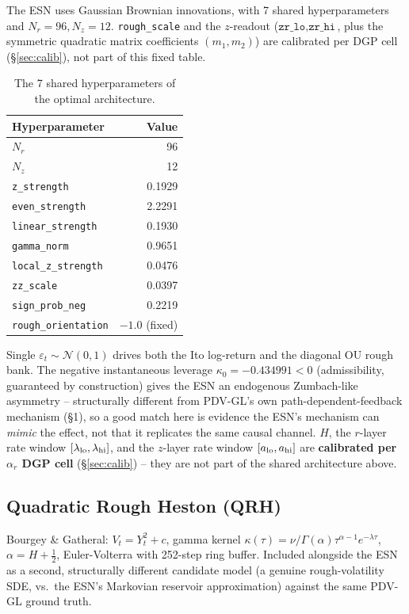 \documentclass[11pt,a4paper]{article}
\begin{document}
The ESN uses Gaussian Brownian innovations, with 7 shared
hyperparameters and $N_r=96,N_z=12$. \texttt{rough\_scale} and the
$z$-readout ($\texttt{zr\_lo},\texttt{zr\_hi}$, plus the symmetric
quadratic matrix coefficients $(m_1,m_2)$) are calibrated per DGP cell
(\S\ref{sec:calib}), not part of this fixed table.
\begin{table}[H]
\centering
\caption{The 7 shared hyperparameters of the optimal architecture.}
\label{tab:optarch}
\begin{tabular}{@{}lr@{}}
\toprule
Hyperparameter & Value \\
\midrule
$N_r$ & 96 \\
$N_z$ & 12 \\
\texttt{z\_strength} & 0.1929 \\
\texttt{even\_strength} & 2.2291 \\
\texttt{linear\_strength} & 0.1930 \\
\texttt{gamma\_norm} & 0.9651 \\
\texttt{local\_z\_strength} & 0.0476 \\
\texttt{zz\_scale} & 0.0397 \\
\texttt{sign\_prob\_neg} & 0.2219 \\
\texttt{rough\_orientation} & $-1.0$ (fixed) \\

\end{tabular}
\end{table}
Single $\varepsilon_t\sim\mathcal{N}(0,1)$ drives both the Ito log-return
and the diagonal OU rough bank. The negative instantaneous leverage
$\kappa_0=-0.434991<0$ (admissibility, guaranteed by construction) gives
the ESN an endogenous Zumbach-like asymmetry -- structurally different
from PDV-GL's own path-dependent-feedback mechanism (\S1), so a good
match here is evidence the ESN's mechanism can \emph{mimic} the effect,
not that it replicates the same causal channel. $H$, the $r$-layer rate
window $[\lambda_{\rm lo},\lambda_{\rm hi}]$, and the $z$-layer rate
window $[a_{\rm lo},a_{\rm hi}]$ are \textbf{calibrated per $\alpha_r$
DGP cell} (\S\ref{sec:calib}) -- they are not part of the shared
architecture above.

\subsection{Quadratic Rough Heston (QRH)}
Bourgey \& Gatheral: $V_t=Y_t^2+c$, gamma kernel
$\kappa(\tau)=\nu/\Gamma(\alpha)\tau^{\alpha-1}e^{-\lambda\tau}$,
$\alpha=H+\tfrac{1}{2}$, Euler-Volterra with 252-step ring buffer.
Included alongside the ESN as a second, structurally different
candidate model (a genuine rough-volatility SDE, vs.\ the ESN's
Markovian reservoir approximation) against the same PDV-GL ground truth.
\end{document}
